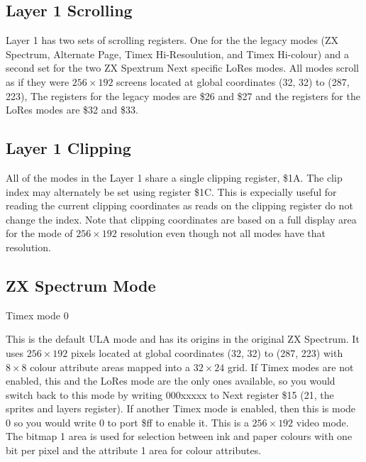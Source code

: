 \subsection{Layer 1 Scrolling}
Layer 1 has two sets of scrolling registers. One for the the legacy
modes (ZX Spectrum, Alternate Page, Timex Hi-Resoulution, and Timex
Hi-colour) and a second set for the two ZX Spextrum Next specific
LoRes modes.  All modes scroll as if they were $256\times192$ screens
located at global coordinates (32, 32) to (287, 223), The registers
for the legacy modes are \$26 and \$27 and the registers for the LoRes
modes are \$32 and \$33.






\subsection{Layer 1 Clipping}
All of the modes in the Layer 1 share a single clipping register,
\$1A. The clip index may alternately be set using register \$1C. This
is expecially useful for reading the current clipping coordinates as
reads on the clipping register do not change the index. Note that
clipping coordinates are based on a full display area for the mode of
$256\times192$ resolution even though not all modes have that
resolution.




\subsection{ZX Spectrum Mode}

Timex mode 0

This is the default ULA mode and has its origins in the original ZX
Spectrum. It uses $256\times192$ pixels located at global coordinates
(32, 32) to (287, 223) with $8\times8$ colour attribute areas mapped
into a $32\times24$ grid. If Timex modes are not enabled, this and the
LoRes mode are the only ones available, so you would switch back to
this mode by writing 000xxxxx to Next register \$15 (21, the sprites
and layers register). If another Timex mode is enabled, then this is
mode 0 so you would write 0 to port \$ff to enable it. This is a
$256\times192$ video mode. The bitmap 1 area is used for selection
between ink and paper colours with one bit per pixel and the attribute
1 area for colour attributes.

